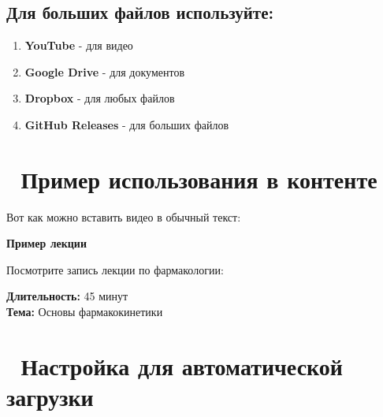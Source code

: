 \documentclass[
  russian,
  12pt,
  a4paper,
]{article}
\providecommand{\tightlist}{%
  \setlength{\itemsep}{0pt}\setlength{\parskip}{0pt}}
\begin{document}
\subsection{Для больших файлов
используйте:}\label{ux434ux43bux44f-ux431ux43eux43bux44cux448ux438ux445-ux444ux430ux439ux43bux43eux432-ux438ux441ux43fux43eux43bux44cux437ux443ux439ux442ux435}

\begin{enumerate}
\def\labelenumi{\arabic{enumi}.}
\tightlist
\item
  \textbf{YouTube} - для видео
\item
  \textbf{Google Drive} - для документов
\item
  \textbf{Dropbox} - для любых файлов
\item
  \textbf{GitHub Releases} - для больших файлов
\end{enumerate}

\section{📝 Пример использования в
контенте}\label{ux43fux440ux438ux43cux435ux440-ux438ux441ux43fux43eux43bux44cux437ux43eux432ux430ux43dux438ux44f-ux432-ux43aux43eux43dux442ux435ux43dux442ux435}

Вот как можно вставить видео в обычный текст:

\begin{tcolorbox}[enhanced jigsaw, breakable, leftrule=.75mm, rightrule=.15mm, bottomrule=.15mm, toprule=.15mm, opacityback=0, arc=.35mm, colback=white, left=2mm, colframe=quarto-callout-note-color-frame]

\vspace{-3mm}\textbf{Пример лекции}\vspace{3mm}

Посмотрите запись лекции по фармакологии:

\textbf{Длительность:} 45 минут\\
\textbf{Тема:} Основы фармакокинетики

\end{tcolorbox}

\section{🔧 Настройка для автоматической
загрузки}\label{ux43dux430ux441ux442ux440ux43eux439ux43aux430-ux434ux43bux44f-ux430ux432ux442ux43eux43cux430ux442ux438ux447ux435ux441ux43aux43eux439-ux437ux430ux433ux440ux443ux437ux43aux438}
\end{document}
